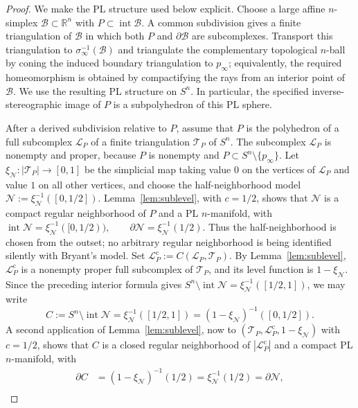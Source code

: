 \documentclass[12pt,oneside,a4paper]{article}
\theoremstyle{mytheorem}
\theoremstyle{remark}
\theoremstyle{definition}
\begin{document}
\begin{proof}
We make the PL structure used below explicit.  Choose a large affine
$n$-simplex $\mathcal{B}\subset\mathbb R^n$ with
$P\subset\operatorname{int}\mathcal{B}$.  A common subdivision gives a
finite triangulation of $\mathcal{B}$ in which both $P$ and
$\partial\mathcal{B}$ are subcomplexes.  Transport this triangulation to
$\sigma_\infty^{-1}(\mathcal{B})$ and triangulate the complementary
topological $n$-ball by coning the induced boundary triangulation to
$p_\infty$; equivalently, the required homeomorphism is obtained by
compactifying the rays from an interior point of $\mathcal{B}$.  We use
the resulting PL structure on $S^n$.  In particular, the specified
inverse-stereographic image of $P$ is a subpolyhedron of this PL sphere.

After a derived subdivision relative to $P$, assume that $P$ is the
polyhedron of a full subcomplex $\mathcal{L}_P$ of a finite triangulation
$\mathcal{T}_P$ of $S^n$.  The subcomplex $\mathcal{L}_P$ is nonempty
and proper, because $P$ is nonempty and
$P\subset S^n\setminus\{p_\infty\}$.  Let
$\xi_{\mathcal{N}}:|\mathcal{T}_P|\to[0,1]$ be the simplicial map taking
value $0$ on the vertices of $\mathcal{L}_P$ and value $1$ on all other
vertices, and choose the half-neighborhood model
$\mathcal{N}:=\xi_{\mathcal{N}}^{-1}([0,1/2]).$
Lemma~\ref{lem:sublevel}, with $c=1/2$, shows that $\mathcal{N}$ is a
compact regular neighborhood of $P$ and a PL $n$-manifold, with
$\operatorname{int}\mathcal{N}
=\xi_{\mathcal{N}}^{-1}([0,1/2)),\qquad
\partial\mathcal{N}=\xi_{\mathcal{N}}^{-1}(1/2).$
Thus the half-neighborhood is chosen from the outset; no arbitrary
regular neighborhood is being identified silently with Bryant's model.
Set $\mathcal{L}_P^{\mathrm c}:=C(\mathcal{L}_P,\mathcal{T}_P).$
By Lemma~\ref{lem:sublevel}, $\mathcal{L}_P^{\mathrm c}$ is a nonempty
proper full subcomplex of $\mathcal{T}_P$, and its level function is
$1-\xi_{\mathcal{N}}$.  Since the preceding interior formula gives
$S^n\setminus\operatorname{int}\mathcal{N}
=\xi_{\mathcal{N}}^{-1}([1/2,1])$, we may write
\[
C:=S^n\setminus\operatorname{int}\mathcal{N}
=\xi_{\mathcal{N}}^{-1}([1/2,1])
=(1-\xi_{\mathcal{N}})^{-1}([0,1/2]).
\]
A second application of Lemma~\ref{lem:sublevel}, now to
$(\mathcal{T}_P,\mathcal{L}_P^{\mathrm c},1-\xi_{\mathcal{N}})$ with
$c=1/2$, shows that $C$ is a closed regular neighborhood of
$|\mathcal{L}_P^{\mathrm c}|$ and a compact PL $n$-manifold, with
\[
\begin{aligned}
 \partial C
 &=(1-\xi_{\mathcal{N}})^{-1}(1/2)
   =\xi_{\mathcal{N}}^{-1}(1/2)
   =\partial\mathcal{N},\\

\end{aligned}\]
\end{proof}
\end{document}
